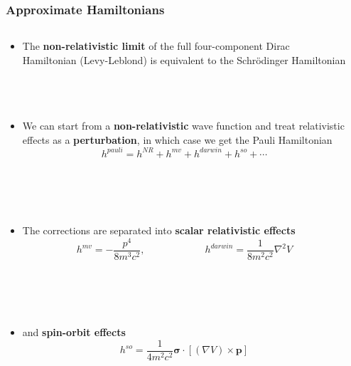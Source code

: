 \documentclass[mathserif,8pt]{beamer}
\begin{document}
\begin{frame}
    \frametitle{Approximate Hamiltonians}
    \begin{columns}
    \begin{column}{.90\textwidth}
    \begin{itemize}
	\item	The \textbf{non-relativistic limit} of the full four-component Dirac Hamiltonian
		(Levy-Leblond) is equivalent to the Schr\"{o}dinger Hamiltonian\\
		\ \\
		\ \\
		\ \\
	\item	We can start from a \textbf{non-relativistic} wave function and treat relativistic\\
		effects as a \textbf{perturbation}, in which case we get the Pauli Hamiltonian
		\begin{equation}
		    \nonumber
		    h^{pauli} = h^{NR} + h^{mv} + h^{darwin} + h^{so} + \cdots
		\end{equation}
		\ \\
		\ \\
		\ \\
		\ \\
	\item	The corrections are separated into \textbf{scalar relativistic effects}
		\begin{equation}
		    \nonumber
		    h^{mv} = -\frac{p^4}{8m^3c^2}, \qquad\qquad\qquad
		    h^{darwin} = \frac{1}{8m^2c^2} \nabla^2V
		\end{equation}
		\ \\
		\ \\
		\ \\
		\ \\
	\item	and \textbf{spin-orbit effects}
		\begin{equation}
		    \nonumber
		    h^{so} = \frac{1}{4m^2c^2}\boldsymbol{\sigma}\cdot
		    \left[\left(\nabla V\right)\times\boldsymbol{p}\right]
		\end{equation}
    \end{itemize}
    \end{column}
    \begin{column}{.10\textwidth}
	\ \\
    \end{column}
    \end{columns}
\end{frame}
\end{document}
